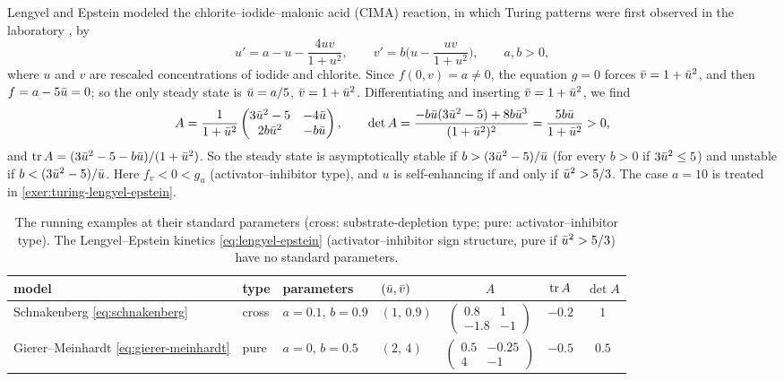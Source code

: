 \begin{example}\label{ex:lengyel-epstein}
Lengyel and Epstein \cite{LengyelEpstein1991} modeled the
chlorite--iodide--malonic acid (CIMA) reaction, in which Turing patterns were first
observed in the laboratory \cite{Castets1990}, by
\begin{equation}\label{eq:lengyel-epstein}
  u'=a-u-\frac{4uv}{1+u^2},\qquad v'=b\Big(u-\frac{uv}{1+u^2}\Big),\qquad a,b>0,
\end{equation}
where $u$ and $v$ are rescaled concentrations of iodide and chlorite. Since
$f(0,v)=a\neq0$, the equation $g=0$ forces $\bar v=1+\bar u^2$, and then $f=a-5\bar u=0$;
so the only steady state is $\bar u=a/5$, $\bar v=1+\bar u^2$. Differentiating
and inserting $\bar v=1+\bar u^2$, we find
\begin{equation*}
  A=\frac{1}{1+\bar u^2}\begin{pmatrix} 3\bar u^2-5 & -4\bar u\\ 2b\bar u^2 & -b\bar u\end{pmatrix},
  \qquad
  \det A=\frac{-b\bar u(3\bar u^2-5)+8b\bar u^3}{(1+\bar u^2)^2}=\frac{5b\bar u}{1+\bar u^2}>0,
\end{equation*}
and $\operatorname{tr} A=(3\bar u^2-5-b\bar u)/(1+\bar u^2)$. So the steady state is asymptotically
stable if $b>(3\bar u^2-5)/\bar u$ (for every $b>0$ if $3\bar u^2\le5$) and unstable if
$b<(3\bar u^2-5)/\bar u$. Here $f_v<0<g_u$ (activator--inhibitor
type), and $u$ is self-enhancing if and only if $\bar u^2>5/3$. The case
$a=10$ is treated in \cref{exer:turing-lengyel-epstein}.
\end{example}

\begin{table}[t]
  \centering
  \caption{The running examples at their standard parameters (cross:
  substrate-depletion type; pure: activator--inhibitor type). The Lengyel--Epstein
  kinetics \eqref{eq:lengyel-epstein} (activator--inhibitor sign structure, pure if
  $\bar u^2>5/3$) have no standard parameters.}
  \label{tab:standard-parameters}
  \small
  \begin{tabular}{@{}llllccc@{}}
    \toprule
    model & type & parameters & $(\bar u,\bar v)$ & $A$ & $\operatorname{tr} A$ & $\det A$\\
    \midrule
    Schnakenberg \eqref{eq:schnakenberg} & cross & $a=0.1$, $b=0.9$ & $(1,\,0.9)$ &
      $\left(\begin{smallmatrix}0.8&1\\-1.8&-1\end{smallmatrix}\right)$ & $-0.2$ & $1$\\[6pt]
    Gierer--Meinhardt \eqref{eq:gierer-meinhardt} & pure & $a=0$, $b=0.5$ & $(2,\,4)$ &
      $\left(\begin{smallmatrix}0.5&-0.25\\4&-1\end{smallmatrix}\right)$ & $-0.5$ & $0.5$\\
    \bottomrule
  \end{tabular}
\end{table}

